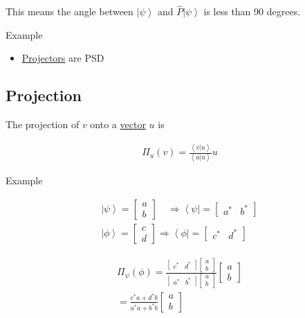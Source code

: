 \documentclass[
]{article}
\providecommand{\tightlist}{%
  \setlength{\itemsep}{0pt}\setlength{\parskip}{0pt}}
\let\oldhyperref\hyperref
\renewcommand{\hyperref}[2][]{\oldhyperref[#1]{\underline{#2}}}
\providecommand{\ket}[1]{\left\lvert #1 \right\rangle}
\providecommand{\bra}[1]{\left\langle #1 \right\rvert}
\providecommand{\braket}[1]{\left\langle #1 \right\rangle}
\providecommand{\Rarr}{\Rightarrow}
\begin{document}
This means the angle between \(\ket{\psi}\) and \(\hat{P}\ket{\psi}\) is
less than 90 degrees.

Example

\begin{itemize}
	\tightlist
	\item
	      \hyperref[projectors]{Projectors} are PSD
\end{itemize}

\subsection{Projection}\label{projections}

The projection of \(v\) onto a
\hyperref[vectors]{vector}
\(u\) is

\begin{gather*}
	\Pi_u(v)=\frac{\braket{v|u}}{\braket{u|u}}u
\end{gather*}

Example

\begin{gather*}
	\ket{\psi}=\begin{bmatrix}a\\b\end{bmatrix}\quad \Rarr \bra{\psi}=\begin{bmatrix}a^* & b^*\end{bmatrix}
	\\
	\ket{\phi}=\begin{bmatrix}c\\d\end{bmatrix}\Rarr \bra{\phi}=\begin{bmatrix}c^* & d^*\end{bmatrix}
\end{gather*}

\begin{gather*}
	\Pi_\psi(\phi)=\frac{\begin{bmatrix}c^* & d^*\end{bmatrix}\begin{bmatrix}a\\b\end{bmatrix}}{\begin{bmatrix}a^* & b^*\end{bmatrix}\begin{bmatrix}a\\b\end{bmatrix}}\begin{bmatrix}a\\b\end{bmatrix}\\
	=\frac{c^*a+d^*b}{a^*a+b^*b}\begin{bmatrix}a\\b\end{bmatrix}
\end{gather*}
\end{document}
